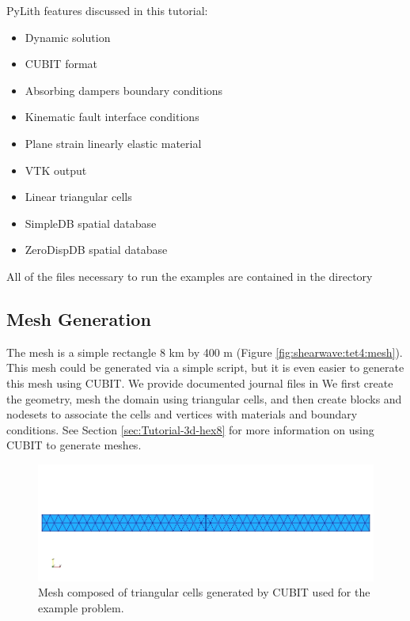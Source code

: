 PyLith features discussed in this tutorial:
\begin{itemize}
\item Dynamic solution
\item CUBIT format
\item Absorbing dampers boundary conditions
\item Kinematic fault interface conditions
\item Plane strain linearly elastic material
\item VTK output
\item Linear triangular cells
\item SimpleDB spatial database
\item ZeroDispDB spatial database
\end{itemize}
All of the files necessary to run the examples are contained in the
directory 


\subsection{Mesh Generation}

The mesh is a simple rectangle 8 km by 400 m (Figure
\vref{fig:shearwave:tet4:mesh}).  This mesh could be generated via a
simple script, but it is even easier to generate this mesh using
CUBIT. We provide documented journal files in
 We first create the geometry,
mesh the domain using triangular cells, and then create blocks and
nodesets to associate the cells and vertices with materials and
boundary conditions. See Section \vref{sec:Tutorial-3d-hex8} for more
information on using CUBIT to generate meshes.

\begin{figure}
  \includegraphics[scale=0.5]{examples/figs/shearwave_tri3mesh}
  \caption{Mesh composed of triangular cells generated by CUBIT used for the
    example problem.}
\label{fig:shearwave:tri3:mesh}
\end{figure}



